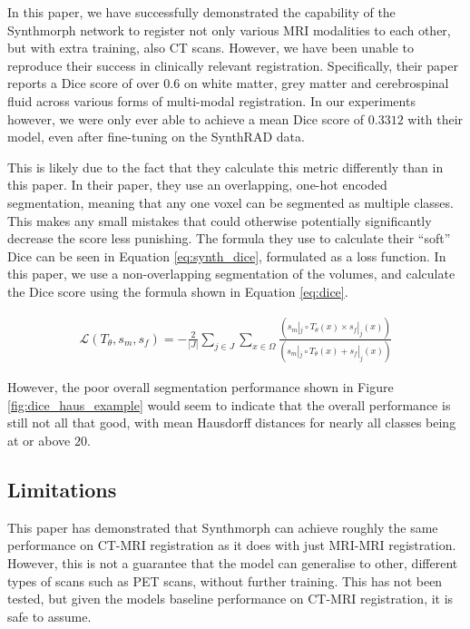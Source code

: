 In this paper, we have successfully demonstrated the capability of the Synthmorph network to register not only various MRI modalities to each other, but with extra training, also CT scans. However, we have been unable to reproduce their success in clinically relevant registration. Specifically, their paper reports a Dice score of over $0.6$ on white matter, grey matter and cerebrospinal fluid across various forms of multi-modal registration.\cite{synthmorph} In our experiments however, we were only ever able to achieve a mean Dice score of $0.3312$ with their model, even after fine-tuning on the SynthRAD data.

This is likely due to the fact that they calculate this metric differently than in this paper. In their paper, they use an overlapping, one-hot encoded segmentation, meaning that any one voxel can be segmented as multiple classes. This makes any small mistakes that could otherwise potentially significantly decrease the score less punishing. The formula they use to calculate their ``soft'' Dice can be seen in Equation \ref{eq:synth_dice}\cite{synthmorph}, formulated as a loss function. In this paper, we use a non-overlapping segmentation of the volumes, and calculate the Dice score using the formula shown in Equation \ref{eq:dice}.

\begin{align}
\mathcal{L}(T_\theta, s_m, s_f) = -\frac{2}{|J|} \sum_{j \in J} \sum_{x \in \Omega} \frac{ \left( s_{m}|_j \circ T_\theta (x) \times s_{f}|_j(x) \right) }{ \left( s_{m}|_j \circ T_\theta (x) + s_{f}|_j(x) \right) }\label{eq:synth_dice}
\end{align}

However, the poor overall segmentation performance shown in Figure \ref{fig:dice_haus_example} would seem to indicate that the overall performance is still not all that good, with mean Hausdorff distances for nearly all classes being at or above $20$.






\subsection{Limitations}
This paper has demonstrated that Synthmorph can achieve roughly the same performance on CT-MRI registration as it does with just MRI-MRI registration. However, this is not a guarantee that the model can generalise to other, different types of scans such as PET scans, without further training. This has not been tested, but given the models baseline performance on CT-MRI registration, it is safe to assume.
